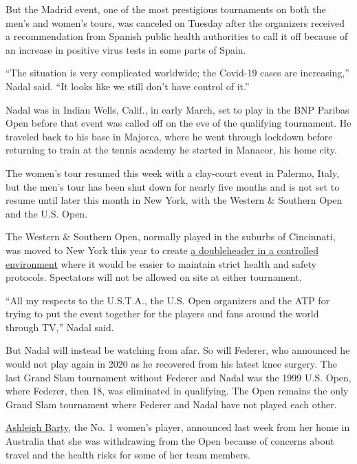 But the Madrid event, one of the most prestigious tournaments on both
the men's and women's tours, was canceled on Tuesday after the
organizers received a recommendation from Spanish public health
authorities to call it off because of an increase in positive virus
tests in some parts of Spain.

``The situation is very complicated worldwide; the Covid-19 cases are
increasing,'' Nadal said. ``It looks like we still don't have control of
it.''

Nadal was in Indian Wells, Calif., in early March, set to play in the
BNP Paribas Open before that event was called off on the eve of the
qualifying tournament. He traveled back to his base in Majorca, where he
went through lockdown before returning to train at the tennis academy he
started in Manacor, his home city.

The women's tour resumed this week with a clay-court event in Palermo,
Italy, but the men's tour has been shut down for nearly five months and
is not set to resume until later this month in New York, with the
Western \& Southern Open and the U.S. Open.

The Western \& Southern Open, normally played in the suburbs of
Cincinnati, was moved to New York this year to create
\href{https://www.nytimes3xbfgragh.onion/2020/08/03/sports/tennis/us-open-hawkeye-line-judges.html}{a
doubleheader in a controlled environment} where it would be easier to
maintain strict health and safety protocols. Spectators will not be
allowed on site at either tournament.

``All my respects to the U.S.T.A., the U.S. Open organizers and the ATP
for trying to put the event together for the players and fans around the
world through TV,'' Nadal said.

But Nadal will instead be watching from afar. So will Federer, who
announced he would not play again in 2020 as he recovered from his
latest knee surgery. The last Grand Slam tournament without Federer and
Nadal was the 1999 U.S. Open, where Federer, then 18, was eliminated in
qualifying. The Open remains the only Grand Slam tournament where
Federer and Nadal have not played each other.

\href{https://www.nytimes3xbfgragh.onion/2020/07/29/sports/tennis/ashleigh-barty-us-open.html}{Ashleigh
Barty}, the No. 1 women's player, announced last week from her home in
Australia that she was withdrawing from the Open because of concerns
about travel and the health risks for some of her team members.

